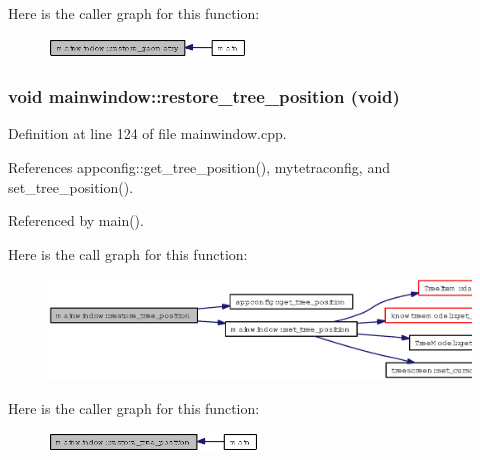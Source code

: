 Here is the caller graph for this function:\begin{figure}[H]
\begin{center}
\leavevmode
\includegraphics[width=149pt]{classmainwindow_79369c37683c95e6e95928571e047100_icgraph}
\end{center}
\end{figure}
\subsubsection{\setlength{\rightskip}{0pt plus 5cm}void mainwindow::restore\_\-tree\_\-position (void)}\label{classmainwindow_8337021add562a78f8f702173d541455}




Definition at line 124 of file mainwindow.cpp.

References appconfig::get\_\-tree\_\-position(), mytetraconfig, and set\_\-tree\_\-position().

Referenced by main().

Here is the call graph for this function:\begin{figure}[H]
\begin{center}
\leavevmode
\includegraphics[width=332pt]{classmainwindow_8337021add562a78f8f702173d541455_cgraph}
\end{center}
\end{figure}


Here is the caller graph for this function:\begin{figure}[H]
\begin{center}
\leavevmode
\includegraphics[width=158pt]{classmainwindow_8337021add562a78f8f702173d541455_icgraph}
\end{center}
\end{figure}
